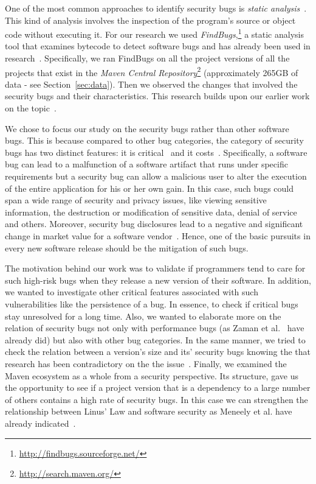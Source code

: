 \documentclass[conference]{llncs}
\begin{document}
One of the most common approaches to identify security bugs is
{\it static analysis}~\cite{CW07}. This kind of analysis involves the
inspection of the program's source or object code without executing
it. For our research we used {\it FindBugs},\footnote{\url{http://findbugs.sourceforge.net/}}
a static analysis tool that examines bytecode to detect software bugs and has already been used in
research~\cite{AP10}\cite{HP07}\cite{HP04}\cite{HW08}\cite{SHP06}.
Specifically, we ran FindBugs on all the project
versions of all the projects that exist in the
{\it Maven Central Repository}\footnote{\url{http://search.maven.org/}}
(approximately 265GB of data - see Section~\ref{sec:data}).
Then we observed the changes that involved the security bugs and their characteristics.
This research builds upon our earlier work on the topic~\cite{MGS12}.

We chose to focus our study on the security bugs rather than other
software bugs. This is because compared to other bug categories,
the category of security bugs has two distinct features: it is critical~\cite{SZ12}
and it costs~\cite{BCL08}. Specifically, a software bug can
lead to a malfunction of a software artifact that runs under specific
requirements but a security bug can allow a malicious user to alter the execution
of the entire application for his or her own gain. In this case, such bugs could span a wide
range of security and privacy issues, like viewing sensitive information, the destruction or
modification of sensitive data, denial of service and others.
Moreover, security bug disclosures lead to a negative and significant change
in market value for a software vendor~\cite{TW07}.
Hence, one of the basic pursuits in every new software release should
be the mitigation of such bugs.

The motivation behind our work was to validate if programmers tend to care for
such high-risk bugs when they release a new version of their software. In
addition, we wanted to investigate other critical features associated with such
vulnerabilities like the persistence of a bug. In essence, to check if critical bugs stay
unresolved for a long time. Also, we wanted to elaborate more on the relation of security
bugs not only with performance bugs (as Zaman et al.~\cite{ZAH11} have already
did) but also with other bug categories. In the same manner, we tried to check
the relation between a version's size and its' security bugs knowing the
that research has been contradictory on the the
issue~\cite{BP84}\cite{SYTP85}\cite{NBZ06}\cite{GKMS00}.
Finally, we examined the Maven ecosystem as a whole from a security
perspective. Its structure, gave us the opportunity to see if a project version that is a dependency to
a large number of others contains a high rate of security bugs.
In this case we can strengthen the relationship between Linus' Law and
software security as Meneely et al. have already indicated~\cite{MW10}.
\end{document}
